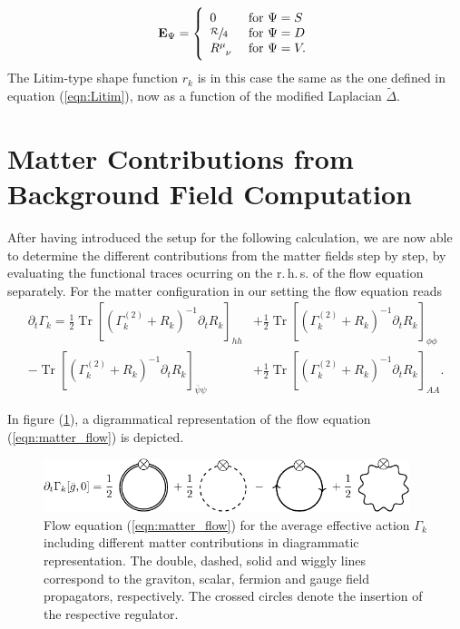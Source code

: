 \begin{align}
	\mathbf{E}_{\Psi} =  \left\{\begin{array}{ll}{0} & {\text { for } \Psi = S} \\ {\sfrac{\mathcal{R}}{4}} & {\text { for } \Psi = D}\\ {R^{\mu}_{\phantom{\mu}\nu}} & {\text { for } \Psi = V.}\end{array}\right.
\end{align}
The Litim-type shape function $r_k$ is in this case the same as the one defined in equation (\ref{eqn:Litim}), now as a function of the modified Laplacian $\tilde{\Delta}$.
\section{Matter Contributions from Background Field Computation}
After having introduced the setup for the following calculation, we are now able to determine the different contributions from the matter fields step by step, by evaluating the functional traces ocurring on the r.\,h.\,s. of the flow equation separately. For the matter configuration in our setting the flow equation reads
\begin{equation}
\begin{aligned} \partial_t\Gamma_{k} =\frac{1}{2} \operatorname{Tr}\left[\left(\Gamma_{k}^{(2)}+R_{k}\right)^{-1} \partial_t R_{k}\right]_{h h} &+ \frac{1}{2}\operatorname{Tr}\left[\left(\Gamma_{k}^{(2)}+R_{k}\right)^{-1} \partial_t R_{k}\right]_{\phi\phi} \\[10pt] -\operatorname{Tr}\left[\left(\Gamma_{k}^{(2)}+R_{k}\right)^{-1}\partial_t R_{k}\right]_{\bar{\psi} \psi}&+\frac{1}{2} \operatorname{Tr}\left[\left(\Gamma_{k}^{(2)}+R_{k}\right)^{-1}\partial_t R_{k}\right]_{AA}.\end{aligned}
\label{eqn:matter_flow}
\end{equation}

In figure (\ref{fig:matter_calc}), a digrammatical representation of the flow equation (\ref{eqn:matter_flow}) is depicted.
\begin{figure}[t]
	\centering
	\includegraphics[width=0.95\textwidth]{figs/TikZ/matter_corrections}
\caption[Flow equation for the average effective action $\Gamma_k$ including different matter contributions in diagrammatic representation.]{Flow equation (\ref{eqn:matter_flow}) for the average effective action $\Gamma_k$ including different matter contributions in diagrammatic representation. The double, dashed, solid and  wiggly lines correspond to the graviton, scalar, fermion and gauge field  propagators, respectively. The crossed circles denote the insertion of the respective regulator.}
	\label{fig:matter_calc}
	\hrulefill
\end{figure}

